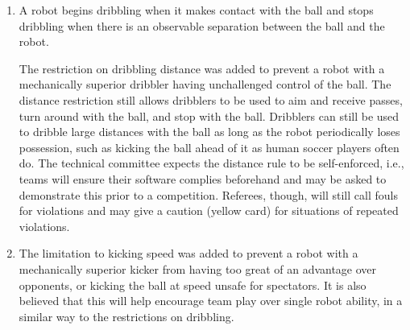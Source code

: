 \begin{enumerate}
\item
A robot begins dribbling when it makes contact with the ball and stops dribbling when there is an observable separation between the ball and the robot.

The restriction on dribbling distance was added to prevent a robot with a mechanically superior dribbler having unchallenged control of the ball.
The distance restriction still allows dribblers to be used to aim and receive passes, turn around with the ball, and stop with the ball.
Dribblers can still be used to dribble large distances with the ball as long as the robot periodically loses possession, such as kicking the ball ahead of it as human soccer players often do.
The technical committee expects the distance rule to be self-enforced, i.e., teams will ensure their software complies beforehand and may be asked to demonstrate this prior to a competition.
Referees, though, will still call fouls for violations and may give a caution (yellow card) for situations of repeated violations.

\item
The limitation to kicking speed was added to prevent a robot with a mechanically superior kicker from having too great of an advantage over opponents, or kicking the ball at speed unsafe for spectators.
It is also believed that this will help encourage team play over single robot ability, in a similar way to the restrictions on dribbling.


\end{enumerate}
